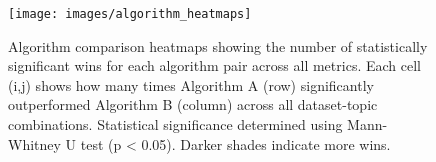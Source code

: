 \begin{landscape}
\begin{figure}[htbp]
\centering
\texttt{[image: images/algorithm\_heatmaps]}
\caption{Algorithm comparison heatmaps showing the number of statistically significant wins for each algorithm pair across all metrics. Each cell (i,j) shows how many times Algorithm A (row) significantly outperformed Algorithm B (column) across all dataset-topic combinations. Statistical significance determined using Mann-Whitney U test (p < 0.05). Darker shades indicate more wins.}
\label{fig:algorithm_heatmaps}
\end{figure}
\end{landscape}
